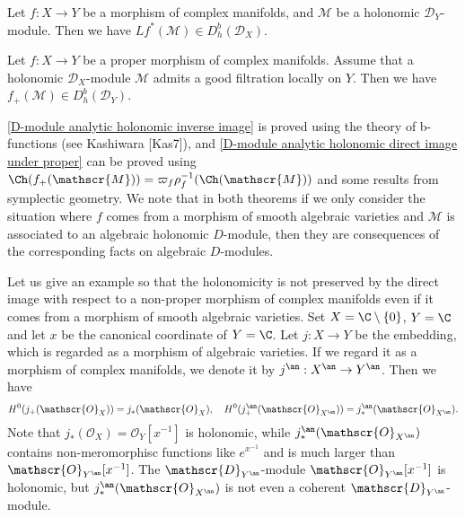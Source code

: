 \begin{theorem}\label{D-module analytic holonomic inverse image}
Let $f:X\to Y$ be a morphism of complex manifolds, and $\mathscr{M}$ be a holonomic $\mathscr{D}_Y$-module. Then we have $Lf^*(\mathscr{M})\in D^b_h(\mathscr{D}_X)$.
\end{theorem}

\begin{theorem}\label{D-module analytic holonomic direct image under proper}
Let $f:X\to Y$ be a proper morphism of complex manifolds. Assume that a holonomic $\mathscr{D}_X$-module $\mathscr{M}$ admits a good filtration locally on $Y$. Then we have $f_+(\mathscr{M})\in D^b_h(\mathscr{D}_Y)$.
\end{theorem}

\cref{D-module analytic holonomic inverse image} is proved using the theory of b-functions (see Kashiwara [Kas7]), and \cref{D-module analytic holonomic direct image under proper} can be proved using $\Ch(f_+(\mathscr{M}))=\varpi_f\rho_f^{-1}(\Ch(\mathscr{M}))$ and some results from symplectic geometry. We note that in both theorems if we only consider the situation where $f$ comes from a morphism of smooth algebraic varieties and $\mathscr{M}$ is associated to an algebraic holonomic $D$-module, then they are consequences of the corresponding facts on algebraic $D$-modules.

\begin{example}
Let us give an example so that the holonomicity is not preserved by the direct image with respect to a non-proper morphism of complex manifolds even if it comes from a morphism of smooth algebraic varieties. Set $X=\C\setminus\{0\}$, $Y=\C$ and let $x$ be the canonical coordinate of $Y=\C$. Let $j:X\to Y$ be the embedding, which is regarded as a morphism of algebraic varieties. If we regard it as a morphism of complex manifolds, we denote it by $j^{\an}:X^{\an}\to Y^{\an}$. Then we have
\[H^0(j_+(\mathscr{O}_X))=j_*(\mathscr{O}_X),\quad H^0(j^{\an}_+(\mathscr{O}_{X^{\an}}))=j^{\an}_*(\mathscr{O}_{X^{\an}}).\]
Note that $j_*(\mathscr{O}_X)=\mathscr{O}_Y[x^{-1}]$ is holonomic, while $j^{\an}_*(\mathscr{O}_{X^{\an}})$ contains non-meromorphisc functions like $e^{x^{-1}}$ and is much larger than $\mathscr{O}_{Y^{\an}}[x^{-1}]$. The $\mathscr{D}_{Y^{\an}}$-module $\mathscr{O}_{Y^{\an}}[x^{-1}]$ is holonomic, but $j^{\an}_*(\mathscr{O}_{X^{\an}})$ is not even a coherent $\mathscr{D}_{Y^{\an}}$-module.
\end{example}

